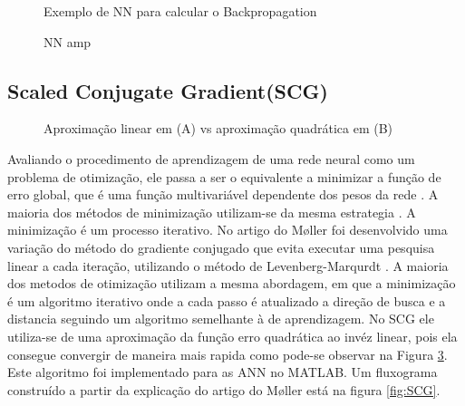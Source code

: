 \begin{figure}[!htp]
	\begin{center}
		\caption{Exemplo de NN para calcular o Backpropagation}		
		
		\label{fig:BPNN}
	\end{center}	
\end{figure}
\begin{figure}[!htp]
	\begin{center}
		\caption{NN amp}		
		
		\label{fig:BPNNAmp}
	\end{center}	
\end{figure}
%		
\subsection{Scaled Conjugate Gradient(SCG)}
\begin{figure}[!h]
	\begin{center}
		\caption{Aproxima\c{c}\~ao linear em (A) vs aproxima\c{c}\~ao quadr\'atica em (B)}		
		
		
		\label{fig:aproxlinqw}
	\end{center}	
\end{figure}	
Avaliando o procedimento de aprendizagem de uma rede neural como um problema de otimização, ele passa a ser o equivalente a minimizar a função de erro global, que \'e uma função multivariável  dependente dos pesos da rede .
A maioria dos m\'etodos de minimiza\c{c}\~ao utilizam-se da mesma estrategia .
A minimiza\c{c}\~ao \'e um processo iterativo.
No artigo do M{\o}ller foi desenvolvido uma variação do método do gradiente conjugado que evita executar uma pesquisa linear a cada iteração, utilizando o m\'etodo de Levenberg-Marqurdt \cite{MollerSCG}.
A maioria dos metodos de otimiza\c{c}\~ao utilizam a mesma abordagem, em que a minimiza\c{c}\~ao \'e um algoritmo iterativo onde a cada passo \'e atualizado a dire\c{c}\~ao de busca e a distancia seguindo um algoritmo semelhante \`a de aprendizagem. No SCG ele utiliza-se de uma aproxima\c{c}\~ao da fun\c{c}\~ao erro quadr\'atica ao inv\'ez linear, pois ela consegue convergir de maneira mais rapida como pode-se observar na Figura \ref{fig:aproxlinqw}. Este algoritmo foi implementado para as \ac{ANN} no MATLAB. Um fluxograma constru\'ido a partir da explica\c{c}\~ao do artigo do M{\o}ller est\'a na figura \ref{fig:SCG}.


